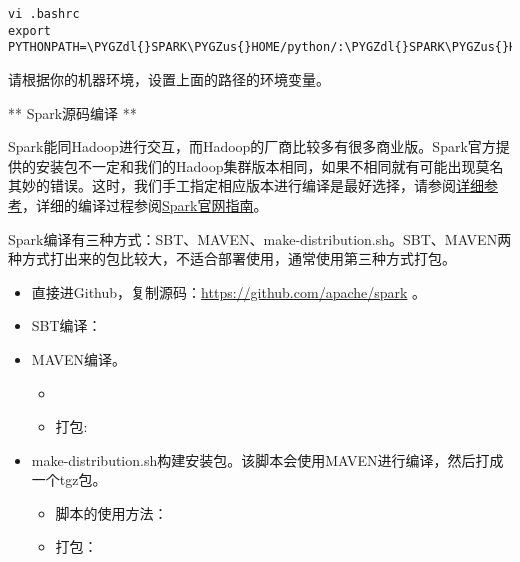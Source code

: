 \documentclass[letterpaper,10pt,english]{sphinxmanual}
\def\PYGZus{\char`\_}
\def\PYGZdl{\char`\$}
\def\PYGZhy{\char`\-}
\begin{document}
\begin{Verbatim}[commandchars=\\\{\}]
vi .bashrc
export PYTHONPATH=\PYGZdl{}SPARK\PYGZus{}HOME/python/:\PYGZdl{}SPARK\PYGZus{}HOME/python/lib/py4j\PYGZhy{}0.8.2.1\PYGZhy{}src.zip:\PYGZdl{}PYTHONPATH
\end{Verbatim}

请根据你的机器环境，设置上面的路径的环境变量。

** Spark源码编译 **

Spark能同Hadoop进行交互，而Hadoop的厂商比较多有很多商业版。Spark官方提供的安装包不一定和我们的Hadoop集群版本相同，如果不相同就有可能出现莫名其妙的错误。这时，我们手工指定相应版本进行编译是最好选择，请参阅\href{http://my.oschina.net/u/2306127/blog/546562}{详细参考}，详细的编译过程参阅\href{http://spark.apache.org/docs/latest/building-spark.html}{Spark官网指南}。

Spark编译有三种方式：SBT、MAVEN、make-distribution.sh。SBT、MAVEN两种方式打出来的包比较大，不适合部署使用，通常使用第三种方式打包。
\begin{itemize}
\item {} 
直接进Github，复制源码：\url{https://github.com/apache/spark} 。

\item {} 
SBT编译：

\item {} 
MAVEN编译。
\begin{itemize}
\item {} 

\item {} 
打包: 

\end{itemize}

\item {} 
make-distribution.sh构建安装包。该脚本会使用MAVEN进行编译，然后打成一个tgz包。
\begin{itemize}
\item {} 
脚本的使用方法：

\item {} 
打包：

\end{itemize}

\end{itemize}
\end{document}
